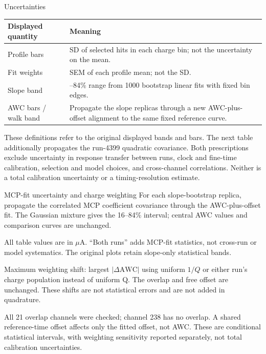 \begin{frame}{Uncertainties}
\small
\begin{tabular}{l>{\raggedright\arraybackslash}p{9.1cm}}
\toprule
Displayed quantity & Meaning\\
\midrule
Profile bars & SD of selected hits in each charge bin; not the uncertainty
on the mean.\\
Fit weights & SEM of each profile mean; not the SD.\\
Slope band & 16--84\% range from 1000 bootstrap linear fits with fixed bin edges.\\
AWC bars / walk band & Propagate the slope replicas through a new AWC-plus-offset
alignment to the same fixed reference curve.\\
\bottomrule
\end{tabular}\par
\medskip
These definitions refer to the original displayed bands and bars.
The next table additionally propagates the run-4399 quadratic covariance.
Both prescriptions exclude uncertainty in response transfer between runs,
clock and fine-time calibration, selection and model choices, and cross-channel correlations.
Neither is a total calibration uncertainty or a timing-resolution estimate.
\end{frame}

\begin{frame}{MCP-fit uncertainty and charge weighting}
\Caption
For each slope-bootstrap replica, propagate the correlated MCP coefficient
covariance through the AWC-plus-offset fit. The Gaussian mixture gives the
16--84\% interval; central AWC values and comparison curves are unchanged.
\par
All table values are in $\mu$A. ``Both runs'' adds MCP-fit statistics, not
cross-run or model systematics. The original plots retain slope-only statistical bands.
{\centering\par}
Maximum weighting shift: largest $|\Delta\mathrm{AWC}|$ using uniform $1/Q$
or either run's charge population instead of uniform Q. The overlap and free
offset are unchanged. These shifts are not statistical errors and are not added in quadrature.
\par
All 21 overlap channels were checked; channel 238 has no overlap.
A shared reference-time offset affects only the fitted offset, not AWC.
These are conditional statistical intervals, with weighting sensitivity
reported separately, not total calibration uncertainties.
\end{frame}

